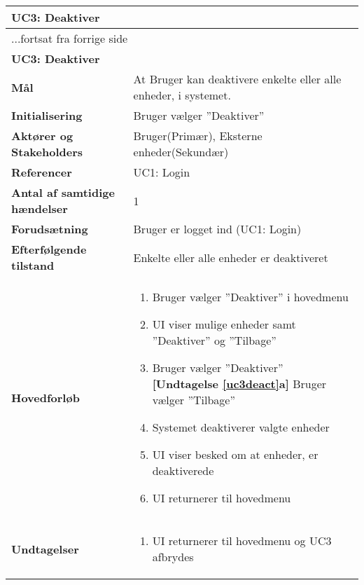 \begin{center} \centering
	\begin{longtable}{|p{6cm}|p{8cm}|}
	\hline
		\multicolumn{2}{|l|}{\textbf{UC3: Deaktiver}} \\\hline
		\endfirsthead
		
		\multicolumn{2}{l}{...fortsat fra forrige side} \\ \hline 
		\multicolumn{2}{|l|}{\textbf{UC3: Deaktiver}} \\\hline
		\endhead	

		\textbf{Mål}						&At Bruger kan deaktivere enkelte eller alle enheder, i systemet. \\\hline
		\textbf{Initialisering} 			&Bruger vælger ''Deaktiver'' \\ \hline
		\textbf{Aktører og Stakeholders}	&Bruger(Primær), Eksterne enheder(Sekundær)\\ \hline
		\textbf{Referencer} 				&UC1: Login \\ \hline
		\textbf{Antal af samtidige hændelser} &1 \\ \hline
		\textbf{Forudsætning} 			&Bruger er logget ind (UC1: Login)\\ \hline
		\textbf{Efterfølgende tilstand} 	&Enkelte eller alle enheder er deaktiveret \\ \hline
		\textbf{Hovedforløb}				&

	\begin{enumerate}	
						
					
				\item Bruger vælger ''Deaktiver'' i hovedmenu
										
				\item \label{uc3menu}UI viser mulige enheder samt ''Deaktiver''  og ''Tilbage''
												
				\item \label{uc3deact} Bruger vælger ''Deaktiver''\newline
					\textbf{[Undtagelse \ref{uc3deact}a]} Bruger vælger ''Tilbage''
												
				\item \label{uc3sysdeact} Systemet deaktiverer valgte enheder
				
				\item UI viser besked om at enheder, er deaktiverede
																	
				\item UI returnerer til hovedmenu	
	
	\end{enumerate} \\ \hline

		\textbf{Undtagelser}	
		
		&\begin{enumerate}[label= \ref{uc3deact}a.]
			\item UI returnerer til hovedmenu og UC3 afbrydes
		\end{enumerate}	
		
		\\ \hline					
											
		
	\end{longtable} 
	\label{UC3}
\end{center}